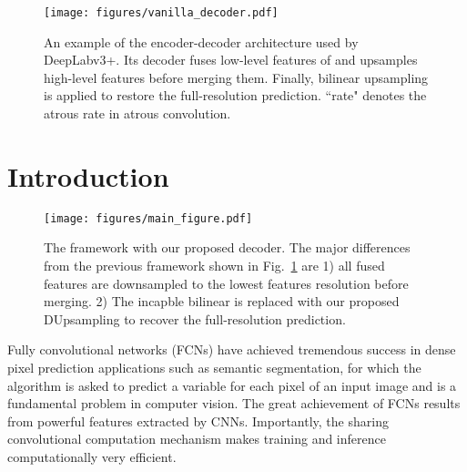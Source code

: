 \documentclass[10pt,twocolumn,letterpaper]{article}
\newcommand{\1}{{\mathbbm{1}}}
\begin{document}
\begin{figure}[t!]
  \centering
  \texttt{[image: figures/vanilla\_decoder.pdf]}
  \caption{An example of the encoder-decoder architecture used by DeepLabv3+. Its decoder fuses low-level features of   and upsamples high-level features before merging them. Finally, bilinear upsampling is applied to restore the full-resolution prediction. ``rate" denotes the atrous rate in atrous convolution.
}
  \label{fig:vanilla_decoder}
\end{figure}





\section{Introduction}
\begin{figure*}[t]
  \centering
  \texttt{[image: figures/main\_figure.pdf]}
  \caption{The framework with our proposed decoder. The major differences from the previous framework shown in Fig.~\ref{fig:vanilla_decoder} are 1) all fused features are downsampled to the lowest features resolution before merging. 2) The incapble bilinear is replaced with our proposed DUpsampling to recover the full-resolution prediction. }
  \vspace{-0.5cm}
  \label{fig:main_figure}
\end{figure*}



Fully convolutional networks (FCNs) \cite{long2015fully} have achieved tremendous success in dense pixel prediction applications such as  semantic segmentation, for which the algorithm is asked to predict a variable for each pixel of an input image and is a fundamental problem in computer vision. The great achievement of FCNs results from powerful features extracted by  CNNs. Importantly, the sharing convolutional computation mechanism makes training and inference computationally very efficient.
\end{document}
